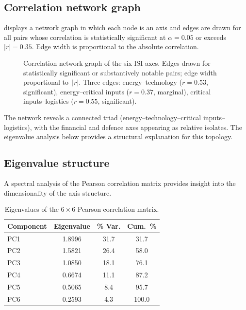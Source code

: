 \subsection{Correlation network graph}

 displays a network graph in which each node
is an axis and edges are drawn for all pairs whose correlation is
statistically significant at $\alpha = 0.05$ or exceeds $|r| = 0.35$.
Edge width is proportional to the absolute correlation.

\begin{figure}[htbp]
\centering

\caption{Correlation network graph of the six ISI axes.  Edges drawn
  for statistically significant or substantively notable pairs; edge
  width proportional to~$|r|$.  Three edges: energy--technology
  ($r = 0.53$, significant), energy--critical inputs ($r = 0.37$,
  marginal), critical inputs--logistics ($r = 0.55$, significant).}
\label{fig:corr-network}
\end{figure}

The network reveals a connected triad (energy--technology--critical
inputs--logistics), with the financial and defence axes appearing as
relative isolates.  The eigenvalue analysis below provides
a structural explanation for this topology.

\subsection{Eigenvalue structure}

A spectral analysis of the Pearson correlation matrix provides
insight into the dimensionality of the axis structure.

\begin{table}[htbp]
\centering
\caption{Eigenvalues of the $6 \times 6$ Pearson correlation matrix.}
\label{tab:eigenvalues}
\small
\setlength{\tabcolsep}{4pt}
\begin{tabular*}{\textwidth}{@{\extracolsep{\fill}} l S[table-format=1.4] S[table-format=3.1,round-precision=1] S[table-format=3.1,round-precision=1] @{}}
\toprule
\textbf{Component} & {\textbf{Eigenvalue}} & {\textbf{\% Var.}}
  & {\textbf{Cum.~\%}} \\
\midrule
PC1 & 1.8996 & 31.7 & 31.7 \\
PC2 & 1.5821 & 26.4 & 58.0 \\
PC3 & 1.0850 & 18.1 & 76.1 \\
PC4 & 0.6674 & 11.1 & 87.2 \\
PC5 & 0.5065 &  8.4 & 95.7 \\
PC6 & 0.2593 &  4.3 & 100.0 \\
\bottomrule
\end{tabular*}
\end{table}

